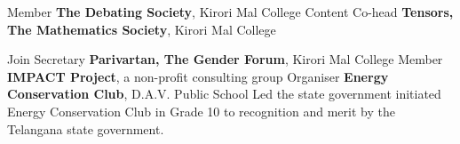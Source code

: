 {Member}
{\textbf{The Debating Society}, Kirori Mal College}
{}
%
%
{Content Co-head}
{\textbf{Tensors, The Mathematics Society}, Kirori Mal College}
{
}

{Join Secretary}
{\textbf{Parivartan, The Gender Forum}, Kirori Mal College}
{
}
{Member}
{\textbf{IMPACT Project}, a non-profit consulting group}
{ }
{Organiser}
{\textbf{Energy Conservation Club}, D.A.V. Public School}
{
    Led the state government initiated Energy Conservation Club
    in Grade 10 to recognition and merit by the Telangana state
    government.
}